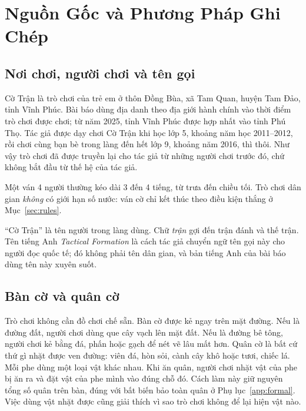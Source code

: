 \section{Nguồn Gốc và Phương Pháp Ghi Chép}
\label{sec:provenance}

\subsection{Nơi chơi, người chơi và tên gọi}

Cờ Trận là trò chơi của trẻ em ở thôn Đồng Bùa, xã Tam Quan, huyện Tam
Đảo, tỉnh Vĩnh Phúc. Bài báo dùng địa danh theo địa giới hành chính vào
thời điểm trò chơi được chơi; từ năm 2025, tỉnh Vĩnh Phúc được hợp nhất
vào tỉnh Phú Thọ. Tác giả được dạy chơi Cờ Trận khi học lớp 5, khoảng năm
học 2011--2012, rồi chơi cùng bạn bè trong làng đến hết lớp 9, khoảng năm
2016, thì thôi. Như vậy trò chơi đã được truyền lại cho tác giả từ những
người chơi trước đó, chứ không bắt đầu từ thế hệ của tác giả.

Một ván 4 người thường kéo dài 3 đến 4 tiếng, từ trưa đến chiều tối. Trò
chơi dân gian \emph{không} có giới hạn số nước: ván cờ chỉ kết thúc theo
điều kiện thắng ở Mục~\ref{sec:rules}.

``Cờ Trận'' là tên người trong làng dùng. Chữ \emph{trận} gợi đến trận
đánh và thế trận. Tên tiếng Anh \emph{Tactical Formation} là cách tác giả
chuyển ngữ tên gọi này cho người đọc quốc tế; đó không phải tên dân gian, và
bản tiếng Anh của bài báo dùng tên này xuyên suốt.

\subsection{Bàn cờ và quân cờ}

Trò chơi không cần đồ chơi chế sẵn. Bàn cờ được kẻ ngay trên mặt đường.
Nếu là đường đất, người chơi dùng que cây vạch lên mặt đất. Nếu là đường bê
tông, người chơi kẻ bằng đá, phấn hoặc gạch để nét vẽ lâu mất hơn. Quân cờ
là bất cứ thứ gì nhặt được ven đường: viên đá, hòn sỏi, cành cây khô hoặc
tươi, chiếc lá. Mỗi phe dùng một loại vật khác nhau. Khi ăn quân, người
chơi nhặt vật của phe bị ăn ra và đặt vật của phe mình vào đúng chỗ đó. Cách
làm này giữ nguyên tổng số quân trên bàn, đúng với bất biến bảo toàn quân ở
Phụ lục~\ref{app:formal}. Việc dùng vật nhặt được cũng giải thích vì sao trò
chơi không để lại hiện vật nào.

